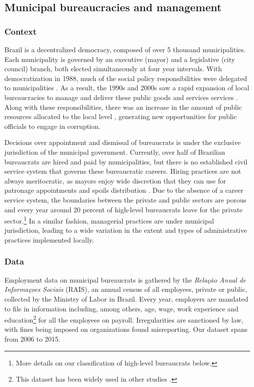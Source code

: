 \documentclass[12pt,a4paper]{article}
\theoremstyle{definition}
\begin{document}
\subsection{Municipal bureaucracies and management}
\label{sub: municipal}

\subsubsection*{Context}

Brazil is a decentralized democracy, composed of over 5 thousand municipalities. Each municipality is governed by an executive (mayor) and a legislative (city council) branch, both elected simultaneously at four year intervals. With democratization in 1988, much of the social policy responsibilities were delegated to  municipalities \citep{abrucio_redefinicao_1996}. As a result, the 1990s and 2000s saw a rapid expansion of local bureaucracies to manage and deliver these public goods and services services \citep{cardoso_jr_burocracia_2011}. Along with these responsibilities, there was an increase in the amount of public resources allocated to the local level \citep{arretche_trajetorias_2015}, generating new opportunities for public officials to engage in corruption.

Decisions over appointment and dismissal of bureaucrats is under the exclusive jurisdiction of the municipal government.  Currently, over half of Brazilian bureaucrats are hired and paid by municipalities, but there is no established civil service system that governs these bureaucratic careers. Hiring practices are not always meritocratic, as mayors enjoy wide discretion that they can use for patronage appointments and spoils distribution \citep{brollo_victor_2017, colonnelli_patronage_2017}. Due to the absence of a career service system, the boundaries between the private and public sectors are porous and every year around 20 percent of high-level bureaucrats leave for the private sector.\footnote{More details on our classification of high-level bureaucrats below.} In a similar fashion, managerial practices are under municipal jurisdiction, leading to a wide variation in the extent and types of administrative practices implemented locally.

\subsubsection*{Data}

Employment data on municipal bureaucrats is gathered by the \emph{Relação Anual de Informaçoes Sociais} (RAIS), an annual census of all employees, private or public, collected by the Ministry of Labor in Brazil. Every year, employers are mandated to file in information including, among others, age, wage, work experience and education\footnote{This dataset has been widely used in other studies \citep[e.g.][]{colonnelli_patronage_2017, brollo_victor_2017}.} for all the employees on payroll. Irregularities are sanctioned by law, with fines being imposed on organizations found misreporting. Our dataset spans from 2006 to 2015. 
\end{document}
